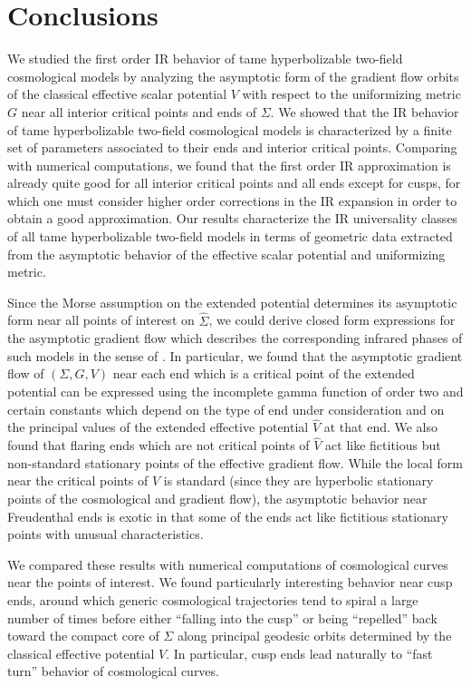 \documentclass[a4paper,11pt]{article}
\theoremstyle{plain}
\theoremstyle{definition}
\theoremstyle{remark}
\def\hV{\widehat{V}}
\def\hSigma{\widehat{\Sigma}}
\def\hV{\widehat{V}}
\begin{document}
\section{Conclusions}

We studied the first order IR behavior of tame hyperbolizable
two-field cosmological models by analyzing the asymptotic form of the
gradient flow orbits of the classical effective scalar potential $V$
with respect to the uniformizing metric $G$ near all interior critical
points and ends of $\Sigma$. We showed that the IR behavior of tame
hyperbolizable two-field cosmological models is characterized by a
finite set of parameters associated to their ends and interior
critical points. Comparing with numerical computations, we found that
the first order IR approximation is already quite good for all
interior critical points and all ends except for cusps, for which one
must consider higher order corrections in the IR expansion in order to
obtain a good approximation. Our results characterize the IR
universality classes of all tame hyperbolizable two-field models in
terms of geometric data extracted from the asymptotic behavior of the
effective scalar potential and uniformizing metric.

Since the Morse assumption on the extended potential determines its
asymptotic form near all points of interest on $\hSigma$, we could
derive closed form expressions for the asymptotic gradient flow which
describes the corresponding infrared phases of such models in the
sense of \cite{ren}. In particular, we found that the asymptotic
gradient flow of $(\Sigma,G,V)$ near each end which is a critical
point of the extended potential can be expressed using the incomplete
gamma function of order two and certain constants which depend on the
type of end under consideration and on the principal values of the
extended effective potential $\hV$ at that end. We also found that
flaring ends which are not critical points of $\hV$ act like
fictitious but non-standard stationary points of the effective
gradient flow. While the local form near the critical points of $V$ is
standard (since they are hyperbolic stationary points
\cite{Palis,Katok} of the cosmological and gradient flow), the
asymptotic behavior near Freudenthal ends is exotic in that some of
the ends act like fictitious stationary points with unusual
characteristics.

We compared these results with numerical computations of cosmological
curves near the points of interest. We found particularly interesting
behavior near cusp ends, around which generic cosmological
trajectories tend to spiral a large number of times before either
``falling into the cusp'' or being ``repelled'' back toward the
compact core of $\Sigma$ along principal geodesic orbits determined by
the classical effective potential $V$.  In particular, cusp ends lead
naturally to ``fast turn'' behavior of cosmological curves.
\end{document}
